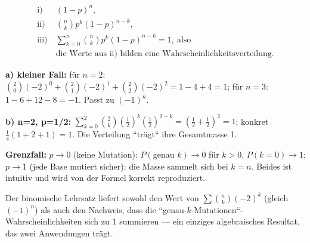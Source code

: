 \begin{ergebnis}
\begin{align*}
  \text{i)}\ &(1-p)^n,\\
  \text{ii)}\ &\binom{n}{k}p^k(1-p)^{n-k},\\
  \text{iii)}\ &\sum_{k=0}^{n}\binom{n}{k}p^k(1-p)^{n-k}=1,\ \text{also}\\
   &\text{die Werte aus ii) bilden eine Wahrscheinlichkeitsverteilung}.
\end{align*}
\end{ergebnis}

\begin{kontrolle}
\textbf{a) kleiner Fall:} für $n=2$: $\binom20(-2)^0+\binom21(-2)^1+
\binom22(-2)^2=1-4+4=1$; für $n=3$: $1-6+12-8=-1$. Passt zu $(-1)^n$.

\textbf{b) n=2, p=1/2:} $\sum_{k=0}^{2}\binom2k(\tfrac12)^k
(\tfrac12)^{2-k}=(\tfrac12+\tfrac12)^2=1$; konkret
$\tfrac14(1+2+1)=1$. Die Verteilung ``trägt`` ihre Gesamtmasse 1.

\textbf{Grenzfall:} $p\to0$ (keine Mutation): $P(\text{genau }k)\to0$
für $k>0$, $P(k=0)\to1$; $p\to1$ (jede Base mutiert sicher): die Masse
sammelt sich bei $k=n$. Beides ist intuitiv und wird von der Formel
korrekt reproduziert.
\end{kontrolle}

\begin{merksatz}
Der binomische Lehrsatz liefert sowohl den Wert von $\sum\binom nk(-2)^k$
(gleich $(-1)^n$) als auch den Nachweis, dass die
``genau-$k$-Mutationen``-Wahrscheinlichkeiten sich zu $1$ summieren ---
ein einziges algebraisches Resultat, das zwei Anwendungen trägt.
\end{merksatz}
